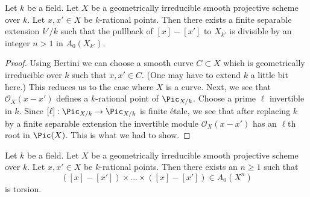 \begin{lemma}
\label{lemma-divide-difference-points}
Let $k$ be a field. Let $X$ be a geometrically irreducible
smooth projective scheme over $k$. Let $x, x' \in X$ be $k$-rational points.
Then there exists a finite separable extension $k'/k$ such that
the pullback of $[x] - [x']$ to $X_{k'}$
is divisible by an integer $n > 1$ in $A_0(X_{k'})$.
\end{lemma}

\begin{proof}
Using Bertini we can choose a smooth curve $C \subset X$
which is geometrically irreducible over $k$
such that $x, x' \in C$. (One may have to extend $k$
a little bit here.) This reduces us to the case where
$X$ is a curve. Next, we see that $\mathcal{O}_X(x - x')$
defines a $k$-rational point of $\Pic_{X/k}$.
Choose a prime $\ell$ invertible in $k$. Since
$[\ell] : \Pic_{X/k} \to \Pic_{X/k}$ is finite \'etale,
we see that after replacing $k$ by a finite separable extension
the invertible module $\mathcal{O}_X(x - x')$ has an
$\ell$th root in $\Pic(X)$. This is what we had to show.
\end{proof}

\begin{lemma}
\label{lemma-smash-nilpotence}
\begin{reference}
\cite{nilpotence}
\end{reference}
Let $k$ be a field. Let $X$ be a geometrically irreducible
smooth projective scheme over $k$. Let $x, x' \in X$ be $k$-rational points.
Then there exists an $n \geq 1$ such that
$$
([x] - [x']) \times \ldots \times ([x] - [x']) \in
A_0(X^n)
$$
is torsion.
\end{lemma}

